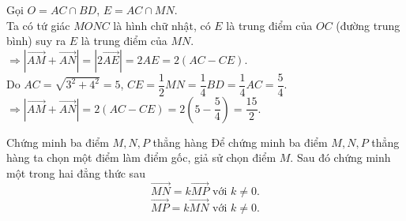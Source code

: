 \begin{bt}
{\begin{listEX}
			Gọi $O=AC\cap BD$, $E=AC\cap MN$.\\
			Ta có tứ giác $MONC$ là hình chữ nhật, có $E$ là trung điểm của $OC$ (đường trung bình) suy ra $E$ là trung điểm của $MN$.\\
			$\Rightarrow \left|\overrightarrow{AM}+\overrightarrow{AN}\right|=\left|2\overrightarrow{AE}\right|=2AE=2(AC-CE)$.\\
			Do $AC=\sqrt{3^2+4^2}=5$, $CE=\dfrac{1}{2}MN=\dfrac{1}{4}BD=\dfrac{1}{4}AC=\dfrac{5}{4}$.\\
			$\Rightarrow \left|\overrightarrow{AM}+\overrightarrow{AN}\right|=2(AC-CE)=2\left(5-\dfrac{5}{4}\right)=\dfrac{15}{2}$.
		\end{listEX}
	}
\end{bt}



\begin{dang}{Chứng minh ba điểm $M, N, P$ thẳng hàng}
	Để chứng minh ba điểm $M, N, P$ thẳng hàng ta chọn một điểm làm điểm gốc, giả sử chọn điểm $ M $. Sau đó  chứng minh một trong hai đẳng thức sau  $$\overrightarrow{MN}=k\overrightarrow{MP} \text{ với } k\neq 0.$$
	$$\overrightarrow{MP}=k\overrightarrow{MN} \text{ với } k\neq 0.$$
\end{dang}

